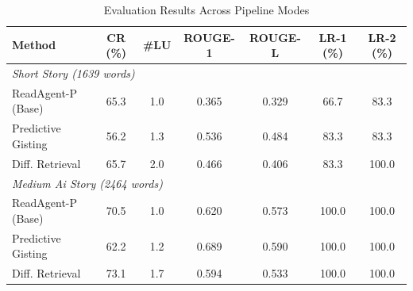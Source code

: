 \begin{table}[htbp]
\centering
\caption{Evaluation Results Across Pipeline Modes}
\label{tab:results}
\begin{tabular}{lcccccc}
\toprule
Method & CR (\%) & \#LU & ROUGE-1 & ROUGE-L & LR-1 (\%) & LR-2 (\%) \\
\midrule
\multicolumn{7}{l}{\textit{Short Story (1639 words)}} \\
  ReadAgent-P (Base) & 65.3 & 1.0 & 0.365 & 0.329 & 66.7 & 83.3 \\
  Predictive Gisting & 56.2 & 1.3 & 0.536 & 0.484 & 83.3 & 83.3 \\
  Diff. Retrieval & 65.7 & 2.0 & 0.466 & 0.406 & 83.3 & 100.0 \\
\midrule
\multicolumn{7}{l}{\textit{Medium Ai Story (2464 words)}} \\
  ReadAgent-P (Base) & 70.5 & 1.0 & 0.620 & 0.573 & 100.0 & 100.0 \\
  Predictive Gisting & 62.2 & 1.2 & 0.689 & 0.590 & 100.0 & 100.0 \\
  Diff. Retrieval & 73.1 & 1.7 & 0.594 & 0.533 & 100.0 & 100.0 \\
\bottomrule
\end{tabular}
\end{table}